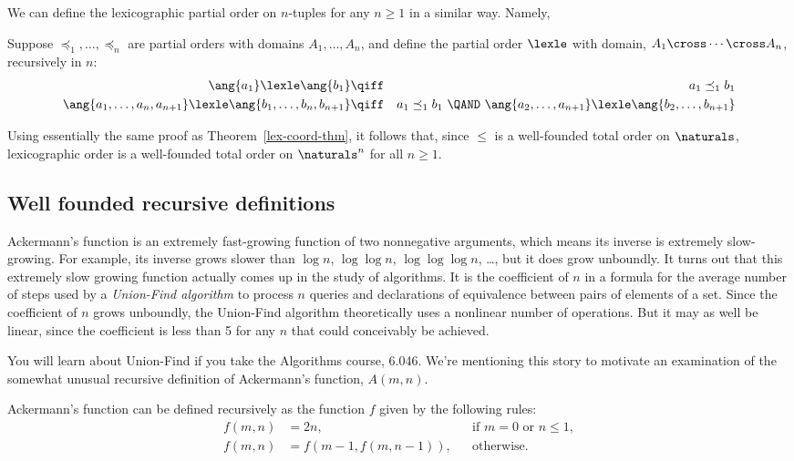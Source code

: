 \iffalse the values of states for the robot in the previous
section were triples not pairs, but\fi We can define the lexicographic
partial order on $n$-tuples for any $n\ge 1$ in a similar way.
Namely,
\begin{definition}\label{lexn}
  Suppose $\preceq_1,\dots, \preceq_n$ are partial orders with domains
  $A_1, \dots, A_n$, and define the partial order $\lexle$ with domain,
  $A_1 \cross \cdots \cross A_n$, recursively in $n$:
\begin{eqnarray*}
\ang{a_1} \lexle \ang{b_1} &\qiff& a_1 \preceq_1 b_1\\
\ang{a_1,\dots,a_n,a_{n+1}} \lexle \ang{b_1,\dots,b_n,b_{n+1}} &\qiff&
  a_1 \preceq_1 b_1\ \QAND\
    \ang{a_2,\dots,a_{n+1}} \lexle \ang{b_2,\dots,b_{n+1}}
\end{eqnarray*}
\end{definition}
Using essentially the same proof as Theorem~\ref{lex-coord-thm}, it
follows that, since $\le$ is a well-founded total order on
$\naturals$, lexicographic order is a well-founded total order on
$\naturals^n$ for all $n \ge 1$.


\subsection{Well founded recursive definitions}

Ackermann's function is an extremely fast-growing function of two
nonnegative arguments, which means its inverse is extremely slow-growing.
For example, its inverse grows slower than $\log n$, $\log \log n$, $\log
\log \log n$, \dots, but it does grow unboundly.  It turns out that this
extremely slow growing function actually comes up in the study of
algorithms.  It is the coefficient of $n$ in a formula for the average
number of steps used by a \emph{Union-Find algorithm} to process $n$
queries and declarations of equivalence between pairs of elements of a
set.  Since the coefficient of $n$ grows unboundly, the Union-Find
algorithm theoretically uses a nonlinear number of operations.  But it may
as well be linear, since the coefficient is less than 5 for any $n$ that
could conceivably be achieved.

You will learn about Union-Find if you take the Algorithms course, 6.046.
We're mentioning this story to motivate an examination of the somewhat
unusual recursive definition of Ackermann's function, $A(m,n)$.

Ackermann's function can be defined recursively as the function $f$
given by the following rules:
\begin{align}
f(m,n) &=  2n, &&\text{if $m=0$ or $n \le 1$},\label{Am0}\\ 
f(m,n) &=  f(m-1,f(m,n-1)), &&\text{otherwise}.\label{AA}
\end{align}

